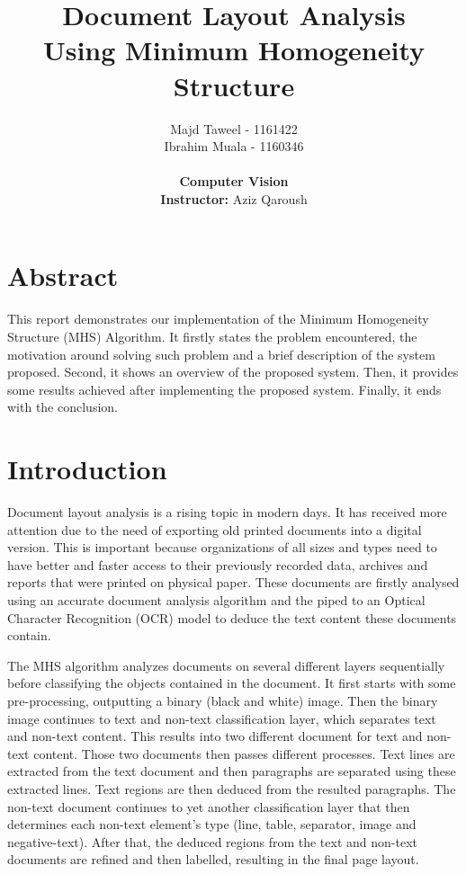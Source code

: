 \documentclass[12pt]{report}
\begin{document}
    \title{
    Document Layout Analysis\\
    \footnotesize Using Minimum Homogeneity Structure
    }
    \author{
    {Majd Taweel - 1161422}\\
    {Ibrahim Muala - 1160346}\\\\

    \textbf{Computer Vision}\\
    \textbf{Instructor:} Aziz Qaroush
    }
    \maketitle

    \chapter*{Abstract}

    This report demonstrates our implementation of the Minimum Homogeneity Structure (MHS) Algorithm.
    It firstly states the problem encountered, the motivation around solving such problem and a brief description
    of the system proposed.
    Second, it shows an overview of the proposed system.
    Then, it provides some results achieved after implementing the proposed system.
    Finally, it ends with the conclusion.

    \tableofcontents


    \chapter{Introduction}

    Document layout analysis is a rising topic in modern days.
    It has received more attention due to the need of exporting old printed documents into a digital version.
    This is important because organizations of all sizes and types need to have better and faster
    access to their previously recorded data, archives and reports that were printed on physical paper.
    These documents are firstly analysed using an accurate document analysis algorithm and the piped to an
    Optical Character Recognition (OCR) model to deduce the text content these documents contain.

    The MHS algorithm analyzes documents on several different layers sequentially before classifying the
    objects contained in the document.
    It first starts with some pre-processing, outputting a binary (black and white) image.
    Then the binary image continues to text and non-text classification layer, which separates text and non-text
    content.
    This results into two different document for text and non-text content.
    Those two documents then passes different processes.
    Text lines are extracted from the text document and then paragraphs are separated using these extracted lines.
    Text regions are then deduced from the resulted paragraphs.
    The non-text document continues to yet another classification layer that then determines each non-text element's
    type (line, table, separator, image and negative-text).
    After that, the deduced regions from the text and non-text documents are refined and then labelled, resulting in
    the final page layout.
\end{document}

